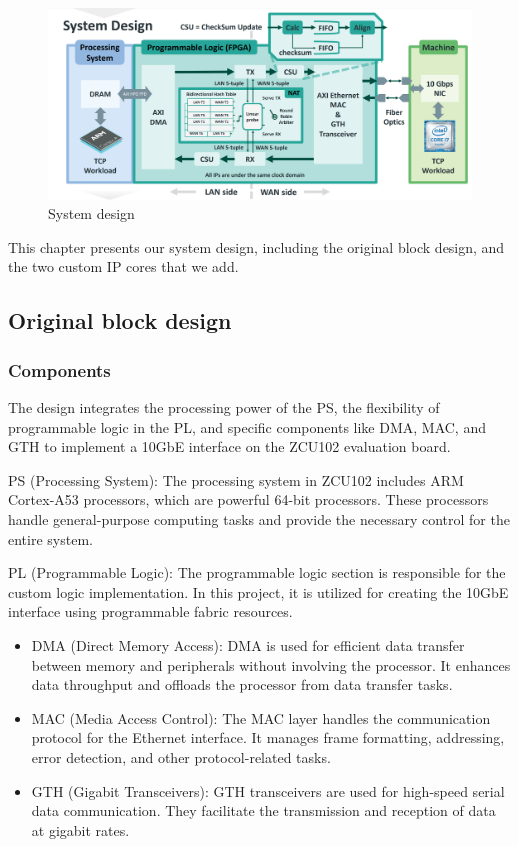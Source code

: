 \begin{figure}[h]
    \centering
    \includegraphics[width=\linewidth]{images/design.png}
    \caption{System design}
\end{figure}
    This chapter presents our system design, including the original block design, and the two custom IP cores that we add. 

\subsection{Original block design}

    \subsubsection{Components}
    The design integrates the processing power of the PS, the flexibility of programmable logic in the PL, and specific components like DMA, MAC, and GTH to implement a 10GbE interface on the ZCU102 evaluation board.

    PS (Processing System): The processing system in ZCU102 includes ARM Cortex-A53 processors, which are powerful 64-bit processors. These processors handle general-purpose computing tasks and provide the necessary control for the entire system.
    
    PL (Programmable Logic): The programmable logic section is responsible for the custom logic implementation. In this project, it is utilized for creating the 10GbE interface using programmable fabric resources.
    \begin{itemize}
    \item {DMA (Direct Memory Access)}: DMA is used for efficient data transfer between memory and peripherals without involving the processor. It enhances data throughput and offloads the processor from data transfer tasks.
    \item {MAC (Media Access Control)}: The MAC layer handles the communication protocol for the Ethernet interface. It manages frame formatting, addressing, error detection, and other protocol-related tasks.
    \item {GTH (Gigabit Transceivers)}: GTH transceivers are used for high-speed serial data communication. They facilitate the transmission and reception of data at gigabit rates.
    \end{itemize}

